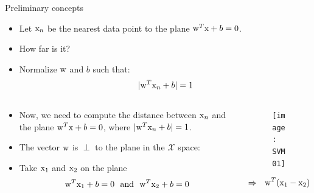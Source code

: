 \begin{frame}{Preliminary concepts}
\begin{itemize}
\item Let ${\rm x}_n$ be the nearest data point to the plane ${\rm w}^T{\rm x}+b=0$. 
\item How far is it?
\item Normalize ${\rm w}$ and $b$ such that:
\[|{\rm w}^T{\rm x}_n+b|=1\]
\end{itemize}
\begin{columns}
\begin{column}{6cm}
\vspace{-12pt}
\begin{itemize}
\item Now, we need to compute the distance between ${\rm x}_n$ and the plane ${\rm w}^T{\rm x}+b=0$, where $|{\rm w}^{T}{\rm x}_n+b|=1$.
\item The vector ${\rm w}$ is $\perp$ to the plane in the $\mathcal{X}$ space:
\item Take ${\rm x}_1$ and ${\rm x}_2$ on the plane
\[{\rm w}^T{\rm x}_1+b=0~~\text{and}~~{\rm w}^T{\rm x}_2+b=0\]
\end{itemize}
\end{column}
\begin{column}{4.5cm}
\begin{figure}
\texttt{[image: SVM01]}
\end{figure}
\[\Rightarrow~~ {\rm w}^T({\rm x}_1-{\rm x}_2)=0\]
\end{column}
\end{columns}
\end{frame}


